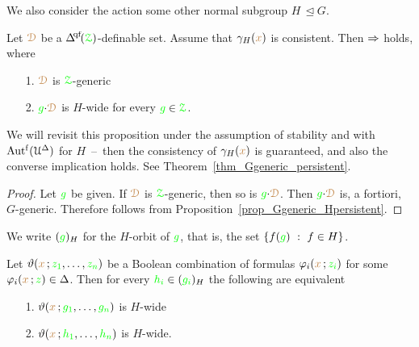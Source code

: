 
We also consider the action some other normal subgroup \emph{$H$\/}$\,\trianglelefteq G$.

\def\medrel#1{\parbox[t]{5ex}{$\displaystyle\hfil #1$}}
\def\ceq#1#2#3{\parbox[t]{6ex}{$\displaystyle #1$}\medrel{#2}{$\displaystyle #3$}}

\begin{proposition}\label{prop_Ggeneric_persistent}
  Let ${\color{brown}\EuScript D}$ be a $\qfDelta(\grZ)$-definable set.
  Assume that $\gamma_H({\color{brown} x})$ is consistent.
  Then $\Rightarrow$ holds, where
  \begin{itemize}
    \item [1.] ${\color{brown}\EuScript D}$ is ${\color{green}\EuScript Z}$-generic
    \item [2.] ${\color{green} g}{\cdot}{\color{brown}\EuScript D}$ is $H$-wide for every ${\color{green} g}\in{\color{green}\EuScript Z}$.
  \end{itemize}
\end{proposition}

We will revisit this proposition under the assumption of stability and with $\mbox{Aut$^{\rm f}$}(\EuScript U^\Delta)$ for $H$~--~then the consistency of $\gamma_H({\color{brown} x})$ is guaranteed, and also the converse implication holds.
See Theorem~\ref{thm_Ggeneric_persistent}.\vspace*{-0.5\baselineskip}
%
\begin{proof}
  Let ${\color{green} g}$ be given.
  If ${\color{brown}\EuScript D}$ is ${\color{green}\EuScript Z}$-generic, then so is ${\color{green} g}{\cdot}{\color{brown}\EuScript D}$.
  Then ${\color{green} g}{\cdot}{\color{brown}\EuScript D}$ is, a fortiori, $G$-generic.
  Therefore  follows from Proposition~\ref{prop_Ggeneric_Hpersistent}.
\end{proof}

We write \emph{$({\color{green} g})_H$\/} for the $H$-orbit of ${\color{green} g}$, that is, the set $\{f({\color{green} g})\ :\ f\in H\}$.

\begin{proposition}\label{prop_wideHcojugate}
  Let $\vartheta({\color{brown} x}\,;{\color{green} z_1},\dots,{\color{green} z_n})$ be a Boolean combination of formulas $\varphi_i({\color{brown} x}\,;{\color{green} z_i})$ for some $\varphi_i({\color{brown} x}\,;{\color{green} z})\in\Delta$.
  Then for every ${\color{green} h_i}\in({\color{green} g_i})_H$ the following are equivalent
  \begin{itemize}
    \item [1.] $\vartheta({\color{brown} x}\,;{\color{green} g_1},\dots,{\color{green} g_n})$ is $H$-wide
    \item [2.] $\vartheta({\color{brown} x}\,;{\color{green} h_1},\dots,{\color{green} h_n})$ is $H$-wide.
  \end{itemize}
\end{proposition}

